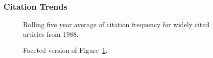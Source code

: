 \documentclass[
  10pt,
  letterpaper,
  DIV=11,
  numbers=noendperiod,
  twoside]{scrartcl}
\begin{document}
\subsubsection*{Citation Trends}\label{sec-trends-1988}

\begin{figure}


\caption{\label{fig-citation-spaghetti-1988}Rolling five year average of
citation frequency for widely cited articles from 1988.}

\end{figure}%

\begin{figure}


\caption{\label{fig-citation-facet-1988}Faceted version of
Figure~\ref{fig-citation-spaghetti-1988}.}

\end{figure}%
\end{document}
